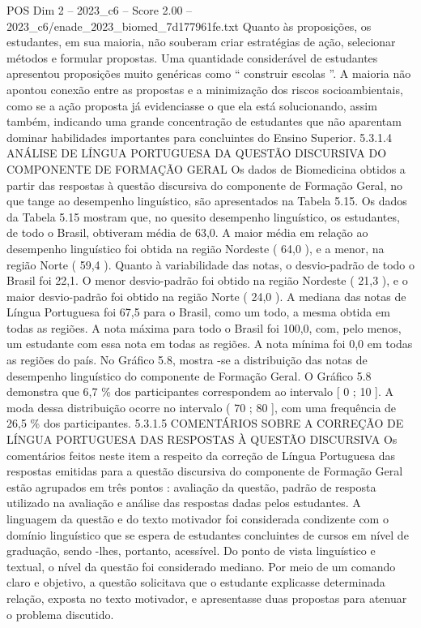 \begin{textsample}{POS Dim 2 – 2023\_c6 – Score 2.00 – 2023\_c6/enade\_2023\_biomed\_7d177961fe.txt}
Quanto às proposições, os estudantes, em sua maioria, não souberam criar estratégias de ação, selecionar métodos e formular propostas.
Uma quantidade considerável de estudantes apresentou proposições muito genéricas como “ construir escolas ”.
A maioria não apontou conexão entre as propostas e a minimização dos riscos socioambientais, como se a ação proposta já evidenciasse o que ela está solucionando, assim também, indicando uma grande concentração de estudantes que não aparentam dominar habilidades importantes para concluintes do Ensino Superior. 5.3.1.4 ANÁLISE DE LÍNGUA PORTUGUESA DA QUESTÃO DISCURSIVA DO COMPONENTE DE FORMAÇÃO GERAL Os dados de Biomedicina obtidos a partir das respostas à questão discursiva do componente de Formação Geral, no que tange ao desempenho linguístico, são apresentados na Tabela 5.15.
Os dados da Tabela 5.15 mostram que, no quesito desempenho linguístico, os estudantes, de todo o Brasil, obtiveram média de 63,0.
A maior média em relação ao desempenho linguístico foi obtida na região Nordeste ( 64,0 ), e a menor, na região Norte ( 59,4 ).
Quanto à variabilidade das notas, o desvio-padrão de todo o Brasil foi 22,1.
O menor desvio-padrão foi obtido na região Nordeste ( 21,3 ), e o maior desvio-padrão foi obtido na região Norte ( 24,0 ).
A mediana das notas de Língua Portuguesa foi 67,5 para o Brasil, como um todo, a mesma obtida em todas as regiões.
A nota máxima para todo o Brasil foi 100,0, com, pelo menos, um estudante com essa nota em todas as regiões.
A nota mínima foi 0,0 em todas as regiões do país.
No Gráfico 5.8, mostra -se a distribuição das notas de desempenho linguístico do componente de Formação Geral.
O Gráfico 5.8 demonstra que 6,7 \% dos participantes correspondem ao intervalo [ 0 ; 10 ].
A moda dessa distribuição ocorre no intervalo ( 70 ; 80 ], com uma frequência de 26,5 \% dos participantes. 5.3.1.5 COMENTÁRIOS SOBRE A CORREÇÃO DE LÍNGUA PORTUGUESA DAS RESPOSTAS À QUESTÃO DISCURSIVA Os comentários feitos neste item a respeito da correção de Língua Portuguesa das respostas emitidas para a questão discursiva do componente de Formação Geral estão agrupados em três pontos : avaliação da questão, padrão de resposta utilizado na avaliação e análise das respostas dadas pelos estudantes.
A linguagem da questão e do texto motivador foi considerada condizente com o domínio linguístico que se espera de estudantes concluintes de cursos em nível de graduação, sendo -lhes, portanto, acessível.
Do ponto de vista linguístico e textual, o nível da questão foi considerado mediano.
Por meio de um comando claro e objetivo, a questão solicitava que o estudante explicasse determinada relação, exposta no texto motivador, e apresentasse duas propostas para atenuar o problema discutido.

\end{textsample}
